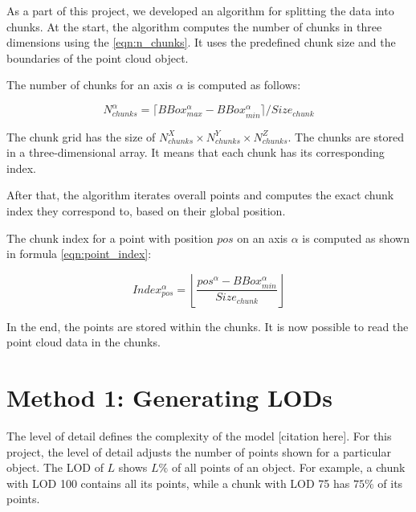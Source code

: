 As a part of this project, we developed an algorithm for splitting the data into chunks. At the start, the algorithm computes the number of chunks in three dimensions using the \autoref{eqn:n_chunks}. It uses the predefined chunk size and the boundaries of the point cloud object.

The number of chunks for an axis $\alpha$ is computed as follows:

\begin{equation}
\label{eqn:n_chunks}
N_{chunks}^\alpha = \lceil BBox_{max}^\alpha - BBox_{min}^\alpha \rceil / Size_{chunk}
\end{equation}

The chunk grid has the size of $N_{chunks}^X \times N_{chunks}^Y \times N_{chunks}^Z$. The chunks are stored in a three-dimensional array. It means that each chunk has its corresponding index.

After that, the algorithm iterates overall points and computes the exact chunk index they correspond to, based on their global position.

The chunk index for a point with position $pos$ on an axis $\alpha$ is computed as shown in formula \ref{eqn:point_index}:

\begin{equation}
\label{eqn:point_index}
Index_{pos}^\alpha = \left \lfloor \frac{pos^{\alpha} - BBox_{min}^\alpha}{Size_{chunk}} \right \rfloor
\end{equation}

In the end, the points are stored within the chunks. It is now possible to read the point cloud data in the chunks.


\section{Method 1: Generating LODs}
\label{sec:generating_lods}

The level of detail defines the complexity of the model [citation here]. For this project, the level of detail adjusts the number of points shown for a particular object.
The LOD of $L$ shows $L\%$ of all points of an object. For example, a chunk with LOD 100 contains all its points, while a chunk with LOD 75 has $75\%$ of its points.

